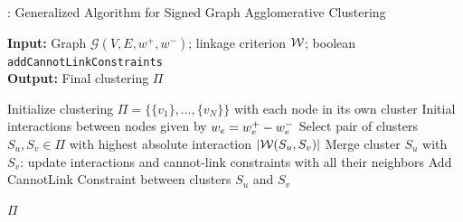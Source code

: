 \begin{algorithm}[t]
  \caption{\algname{}: Generalized Algorithm for Signed Graph Agglomerative Clustering}
   \hspace*{\algorithmicindent} \textbf{Input:} Graph $\mathcal{G}(V,E,w^+,w^-)$; linkage criterion $\mathcal{W}{}$; boolean {\color{blue}\texttt{addCannotLinkConstraints}}  \\
  \hspace*{\algorithmicindent} \textbf{Output:} Final clustering $\Pi$\\
  \hspace*{\algorithmicindent} 
  \begin{algorithmic}[1]
      \State Initialize clustering $\Pi=\{\{v_1\}, \ldots, \{v_N\}\}$ with each node in its own cluster
      \State Initial interactions between nodes given by $w_e = w^+_e - w^-_e$
      \Repeat
        \State Select pair of clusters $S_u,S_v\in\Pi$ with highest absolute interaction $|\mathcal{W}{}(S_u,S_v)|$
          \State Merge cluster $S_u$ with $S_v$: update interactions and cannot-link constraints with all their neighbors
        \EndIf
          \State Add CannotLink Constraint between clusters $S_u$ and $S_v$
        \EndIf
      
      \State
      \Return $\Pi$
  \end{algorithmic}
  \label{main_alg}
\end{algorithm}

